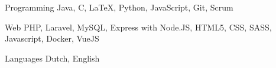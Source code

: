


\begin{cvskills}


\cvskill
{Programming} %
{Java, C, LaTeX, Python, JavaScript, Git, Scrum} %


\cvskill
{Web} %
{PHP, Laravel, MySQL, Express with Node.JS, HTML5, CSS, SASS, Javascript, Docker, VueJS} %


\cvskill
{Languages} %
{Dutch, English} %


\end{cvskills}
